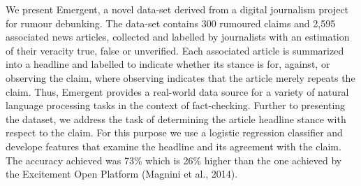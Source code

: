 We present Emergent, a novel data-set derived from a digital journalism project for rumour debunking. The data-set contains 300 rumoured claims and 2,595 associated news articles, collected and labelled by journalists with an estimation of their veracity true, false or unverified. Each associated article is summarized into a headline and labelled to indicate whether its stance is for, against, or observing the claim, where observing indicates that the article merely repeats the claim. Thus, Emergent provides a  real-world data source for a variety of natural language processing tasks in the context of fact-checking. Further to presenting the dataset, we address the task of determining the article headline stance with respect to the claim. For this purpose we use a logistic regression classifier and develope features that examine the headline and its agreement with the claim. The accuracy achieved was 73\% which is 26\% higher than the one achieved by the Excitement Open Platform (Magnini et al., 2014).
